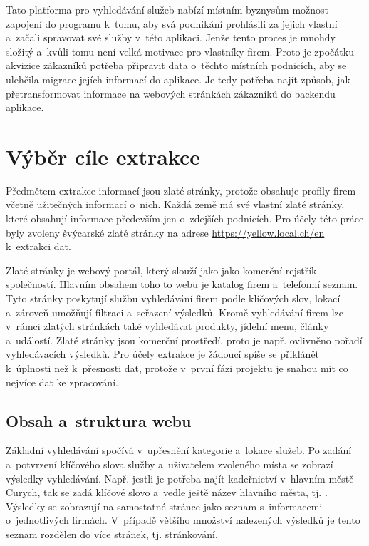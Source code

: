 \documentclass[11pt,a4paper]{article}
\begin{document}
Tato platforma pro vyhledávání služeb nabízí místním byznysům možnost zapojení do programu k~tomu, aby svá podnikání prohlásili za jejich vlastní a~začali spravovat své služby v~této aplikaci. Jenže tento proces je mnohdy složitý a~kvůli tomu není velká motivace pro vlastníky firem. Proto je zpočátku akvizice zákazníků potřeba připravit data o~těchto místních podnicích, aby se ulehčila migrace jejích informací do aplikace. Je tedy potřeba najít způsob, jak přetransformovat informace na webových stránkách zákazníků do backendu aplikace.


\section{Výběr cíle extrakce}
Předmětem extrakce informací jsou zlaté stránky, protože obsahuje profily firem včetně užitečných informací o~nich. Každá země má své vlastní zlaté stránky, které obsahují informace především jen o~zdejších podnicích. Pro účely této práce byly zvoleny švýcarské zlaté stránky na adrese \url{https://yellow.local.ch/en} k~extrakci dat.

Zlaté stránky je webový portál, který slouží jako jako komerční rejstřík společností. Hlavním obsahem toho to webu je katalog firem a~telefonní seznam. Tyto stránky poskytují službu vyhledávání firem podle klíčových slov, lokací a~zároveň umožňují filtraci a~seřazení výsledků. Kromě vyhledávání firem lze v~rámci zlatých stránkách také vyhledávat produkty, jídelní menu, články a~událostí. Zlaté stránky jsou komerční prostředí, proto je např. ovlivněno pořadí vyhledávacích výsledků. Pro účely extrakce je žádoucí spíše se přiklánět k~úplnosti než k~přesnosti dat, protože v~první fázi projektu je snahou mít co nejvíce dat ke zpracování.

\subsection{Obsah a~struktura webu}
Základní vyhledávání spočívá v~upřesnění kategorie a~lokace služeb. Po zadání a~potvrzení klíčového slova služby a~uživatelem zvoleného místa se zobrazí výsledky vyhledávání. Např. jestli je potřeba najít kadeřnictví v~hlavním městě Curych, tak se zadá klíčové slovo  a~vedle ještě název hlavního města, tj. . Výsledky se zobrazují na samostatné stránce jako seznam s~informacemi o~jednotlivých firmách. V~případě většího množství nalezených výsledků je tento seznam rozdělen do více stránek, tj. stránkování.
\end{document}
